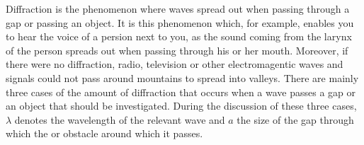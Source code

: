 



\thispagestyle{plain}



Diffraction is the phenomenon where waves spread out when passing through a gap or passing an object. It is this phenomenon which, for example, enables you to hear the voice of a persion next to you, as the sound coming from the larynx of the person spreads out when passing through his or her mouth. Moreover, if there were no diffraction, radio, television or other electromagentic waves and signals could not pass around mountains to spread into valleys. There are mainly three cases of the amount of diffraction that occurs when a wave passes a gap or an object that should be investigated. During the discussion of these three cases, $\lambda$ denotes the wavelength of the relevant wave and $a$ the size of the gap through which the or obstacle around which it passes.

